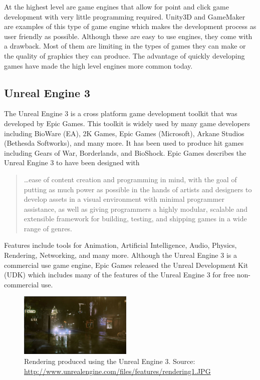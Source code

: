 At the highest level are game engines that allow for point and click game development with very little programming required. Unity3D and GameMaker are examples of this type of game engine which makes the development process as user friendly as possible. Although these are easy to use engines, they come with a drawback. Most of them are limiting in the types of games they can make or the quality of graphics they can produce. The advantage of quickly developing games have made the high level engines more common today.
 
\subsection{Unreal Engine 3}
The Unreal Engine 3 is a cross platform game development toolkit that was developed by Epic Games. This toolkit is widely used by many game developers including BioWare (EA), 2K Games, Epic Games (Microsoft), Arkane Studios (Bethesda Softworks), and many more. It has been used to produce hit games including Gears of War, Borderlands, and BioShock. Epic Games describes the Unreal Engine 3 to have been designed with

\begin{quote}
\ldots ease of content creation and programming in mind, with the goal of putting as much power as possible in the hands of artists and designers to develop assets in a visual environment with minimal programmer assistance, as well as giving programmers a highly modular, scalable and extensible framework for building, testing, and shipping games in a wide range of genres. \cite{unreal_engine_3}
\end{quote}

Features include tools for Animation, Artificial Intelligence, Audio, Physics, Rendering, Networking, and many more. Although the Unreal Engine 3 is a commercial use game engine, Epic Games released the Unreal Development Kit (UDK) which includes many of the features of the Unreal Engine 3 for free non-commercial use.

\begin{figure}[h!]
  \centering \includegraphics[width=0.48\textwidth]{Images/unreal_engine3_rendering.jpg}
	\caption{Rendering produced using the Unreal Engine 3. Source: \url{http://www.unrealengine.com/files/features/rendering1.JPG}}
\end{figure}

